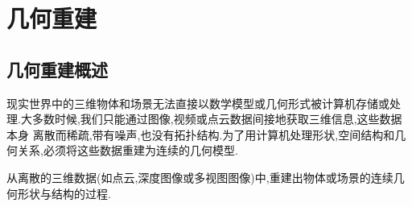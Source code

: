 \documentclass{ctexart}
\begin{document}
\section{几何重建}
\subsection{几何重建概述}
现实世界中的三维物体和场景无法直接以数学模型或几何形式被计算机存储或处理.大多数时候,我们只能通过图像,视频或点云数据间接地获取三维信息,这些数据本身
离散而稀疏,带有噪声,也没有拓扑结构.为了用计算机处理形状,空间结构和几何关系,必须将这些数据重建为连续的几何模型.
\begin{definition}[几何重建]
    从离散的三维数据(如点云,深度图像或多视图图像)中,重建出物体或场景的连续几何形状与结构的过程.
\end{definition}
\end{document}

